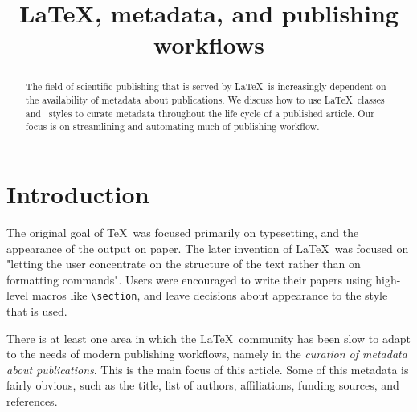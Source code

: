 \documentclass[version=preprint]{iacrcc}
\title[subtitle={(updated April 3, 2023)}]{LaTeX, metadata, and publishing workflows}
\affiliation[country={Belgium}]{NXP Semiconductors}
\affiliation[country={United States}]{Self}
\begin{document}
\maketitle
{}

\begin{abstract}
The field of scientific publishing that is served by \LaTeX\ is increasingly
dependent on the availability of metadata about publications. We discuss how
to use \LaTeX\ classes and \BibTeX\ styles to curate metadata throughout the
life cycle of a published article. Our focus is on streamlining and automating
much of publishing workflow.
\end{abstract}

\section{Introduction}
The original goal of \TeX\ was focused primarily on typesetting, and the
appearance of the output on paper. The later invention of \LaTeX\ was focused
on "letting the user concentrate on the structure of the text rather than on
formatting commands". Users were encouraged to write their papers using
high-level macros like \texttt{\textbackslash{}section}, and leave decisions
about appearance to the style that is used.

There is at least one area in which the \LaTeX\ community has been slow to
adapt to the needs of modern publishing workflows, namely in the
{\em curation of metadata about publications}. This is the main focus of this
article. Some of this metadata is fairly obvious, such as the title, list of
authors, affiliations, funding sources, and references.
\end{document}
